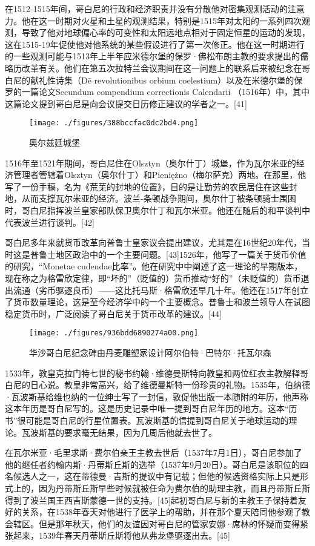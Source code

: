 在1512-1515年间，哥白尼的行政和经济职责并没有分散他对密集观测活动的注意力。他在这一时期对火星和土星的观测结果，特别是1515年对太阳的一系列四次观测，导致了他对地球偏心率的可变性和太阳远地点相对于固定恒星的运动的发现，这在1515-19年促使他对他系统的某些假设进行了第一次修正。他在这一时期进行的一些观测可能与1513年上半年应米德尔堡的保罗·佛松布朗主教的要求提出的儒略历改革有关。他们在第五次拉特兰会议期间在这一问题上的联系后来被纪念在哥白尼的献礼性诗集（Dē revolutionibus orbium coelestium）以及在米德尔堡的保罗的一篇论文Secundum compendium correctionis Calendarii （1516年）中，其中这篇论文提到哥白尼是向会议提交日历修正建议的学者之一。[41]
\begin{figure}[ht]
\centering
\texttt{[image: ./figures/388bccfac0dc2bd4.png]}
\caption{奥尔兹廷城堡} \label{fig_GBN_14}
\end{figure}
1516年至1521年期间，哥白尼住在Olsztyn（奥尔什丁）城堡，作为瓦尔米亚的经济管理者管辖着Olsztyn（奥尔什丁）和Pieniężno（梅尔萨克）两地。在那里，他写了一份手稿，名为《荒芜的封地的位置》，目的是让勤劳的农民居住在这些封地，从而支撑瓦尔米亚的经济。波兰-条顿战争期间，奥尔什丁被条顿骑士围困时，哥白尼指挥波兰皇家部队保卫奥尔什丁和瓦尔米亚。他还在随后的和平谈判中代表波兰进行谈判。[42]

哥白尼多年来就货币改革向普鲁士皇家议会提出建议，尤其是在16世纪20年代，当时这是普鲁士地区政治中的一个主要问题。[43]1526年，他写了一篇关于货币价值的研究，“Monetae cudendae比率”。他在研究中中阐述了这一理论的早期版本，现在称之为格雷欣定律，即“坏的”（贬值的）货币推动“好的”（未贬值的）货币退出流通（劣币驱逐良币）——这比托马斯·格雷欣还早几十年。他还在1517年创立了货币数量理论，这是至今经济学中的一个主要概念。普鲁士和波兰领导人在试图稳定货币时，广泛阅读了哥白尼关于货币改革的建议。[44]
\begin{figure}[ht]
\centering
\texttt{[image: ./figures/936bdd6890274a00.png]}
\caption{华沙哥白尼纪念碑由丹麦雕塑家设计阿尔伯特·巴特尔·托瓦尔森} \label{fig_GBN_15}
\end{figure}
1533年，教皇克拉门特七世的秘书约翰·维德曼斯特向教皇和两位红衣主教解释哥白尼的日心说。教皇非常高兴，给了维德曼斯特一份珍贵的礼物。1535年，伯纳德·瓦波斯基给维也纳的一位绅士写了一封信，敦促他出版一本随附的年历，他声称这本年历是哥白尼写的。这是历史记录中唯一提到哥白尼年历的地方。这本“历书”很可能是哥白尼的行星位置表。瓦波斯基的信提到哥白尼关于地球运动的理论。瓦波斯基的要求毫无结果，因为几周后他就去世了。

在瓦尔米亚·毛里求斯·费尔伯亲王主教去世后（1537年7月1日），哥白尼参加了他的继任者约翰内斯·丹蒂斯丘斯的选举（1537年9月20日）。哥白尼是该职位的四名候选人之一，这在蒂德曼·吉斯的提议中有记载；但他的候选资格实际上只是形式上的，因为丹蒂斯丘斯早些时候就被任命为费尔伯的助理主教，而且丹蒂斯丘斯得到了波兰国王西吉斯蒙德一世的支持。[45]起初哥白尼与新的主教王子保持着友好的关系，在1538年春天对他进行了医学上的帮助，并在那个夏天陪同他参观了教会辖区。但是那年秋天，他们的友谊因对哥白尼的管家安娜·席林的怀疑而变得紧张起来，1539年春天丹蒂斯丘斯将他从弗龙堡驱逐出去。[45]

